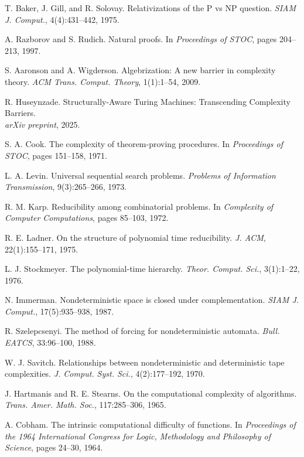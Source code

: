 \documentclass[11pt]{article}
\theoremstyle{plain}
\theoremstyle{definition}
\begin{document}
\begin{thebibliography}{99}
 T. Baker, J. Gill, and R. Solovay. Relativizations of the P vs NP question. \emph{SIAM J. Comput.}, 4(4):431--442, 1975.

 A. Razborov and S. Rudich. Natural proofs. In \emph{Proceedings of STOC}, pages 204--213, 1997.

 S. Aaronson and A. Wigderson. Algebrization: A new barrier in complexity theory. \emph{ACM Trans. Comput. Theory}, 1(1):1--54, 2009.

 R. Huseynzade. Structurally-Aware Turing Machines: Transcending Complexity Barriers. \\
\emph{arXiv preprint}, 2025.

 S. A. Cook. The complexity of theorem-proving procedures. In \emph{Proceedings of STOC}, pages 151--158, 1971.

 L. A. Levin. Universal sequential search problems. \emph{Problems of Information Transmission}, 9(3):265--266, 1973.

 R. M. Karp. Reducibility among combinatorial problems. In \emph{Complexity of Computer Computations}, pages 85--103, 1972.

 R. E. Ladner. On the structure of polynomial time reducibility. \emph{J. ACM}, 22(1):155--171, 1975.

 L. J. Stockmeyer. The polynomial-time hierarchy. \emph{Theor. Comput. Sci.}, 3(1):1--22, 1976.

 N. Immerman. Nondeterministic space is closed under complementation. \emph{SIAM J. Comput.}, 17(5):935--938, 1987.

 R. Szelepcsenyi. The method of forcing for nondeterministic automata. \emph{Bull. EATCS}, 33:96--100, 1988.

 W. J. Savitch. Relationships between nondeterministic and deterministic tape complexities. \emph{J. Comput. Syst. Sci.}, 4(2):177--192, 1970.

 J. Hartmanis and R. E. Stearns. On the computational complexity of algorithms. \emph{Trans. Amer. Math. Soc.}, 117:285--306, 1965.

 A. Cobham. The intrinsic computational difficulty of functions. In \emph{Proceedings of the 1964 International Congress for Logic, Methodology and Philosophy of Science}, pages 24--30, 1964.


\end{thebibliography}
\end{document}
